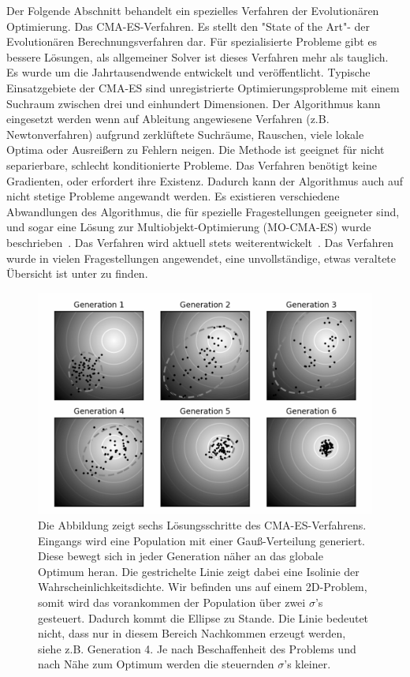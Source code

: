 Der Folgende Abschnitt behandelt ein spezielles Verfahren der Evolutionären Optimierung. Das CMA-ES-Verfahren. Es stellt den "State of the Art"- der Evolutionären Berechnungsverfahren dar. Für spezialisierte Probleme gibt es bessere Lösungen, als allgemeiner Solver ist dieses Verfahren mehr als tauglich. Es wurde um die Jahrtausendwende entwickelt und veröffentlicht. Typische Einsatzgebiete der CMA-ES sind unregistrierte Optimierungsprobleme mit einem Suchraum zwischen drei und einhundert Dimensionen. Der Algorithmus kann eingesetzt werden wenn auf Ableitung angewiesene Verfahren (z.B. Newtonverfahren) aufgrund zerklüftete Suchräume, Rauschen, viele lokale Optima oder Ausreißern zu Fehlern neigen. Die Methode ist geeignet für nicht separierbare, schlecht konditionierte Probleme. Das Verfahren benötigt keine Gradienten, oder erfordert ihre Existenz. Dadurch kann der Algorithmus auch auf nicht stetige Probleme angewandt werden. Es existieren verschiedene Abwandlungen des Algorithmus, die für spezielle Fragestellungen geeigneter sind, und sogar eine Lösung zur Multiobjekt-Optimierung (MO-CMA-ES) wurde beschrieben~\cite{HansenMOO:1}. Das Verfahren wird aktuell stets weiterentwickelt~\cite{hansen2004ecm,hansen2009bbi}. Das Verfahren wurde in vielen Fragestellungen angewendet, eine unvollständige, etwas veraltete Übersicht ist unter \cite{CMAESOverview} zu finden.
%
\begin{figure} [ht!]
\centering
         \caption[Konzept direkter Optimierung mittels CMA-ES]{Die Abbildung zeigt sechs Lösungsschritte des CMA-ES-Verfahrens. Eingangs wird eine Population mit einer Gauß-Verteilung generiert. Diese bewegt sich in jeder Generation näher an das globale Optimum heran. Die gestrichelte Linie zeigt dabei eine Isolinie der Wahrscheinlichkeitsdichte. Wir befinden uns auf einem 2D-Problem, somit wird das vorankommen der Population über zwei $\sigma$'s gesteuert. Dadurch kommt die Ellipse zu Stande. Die Linie bedeutet nicht, dass nur in diesem Bereich Nachkommen erzeugt werden, siehe z.B. Generation 4. Je nach Beschaffenheit des Problems und nach Nähe zum Optimum werden die steuernden $\sigma$'s kleiner. \cite{Wiki:Images:1}}
         \label{fig:conecpt_cma.es}
         \vspace{0.5cm}
         \includegraphics[width=\textwidth]{img/CMA-ES_algorithm.png}
%      
\end{figure}

